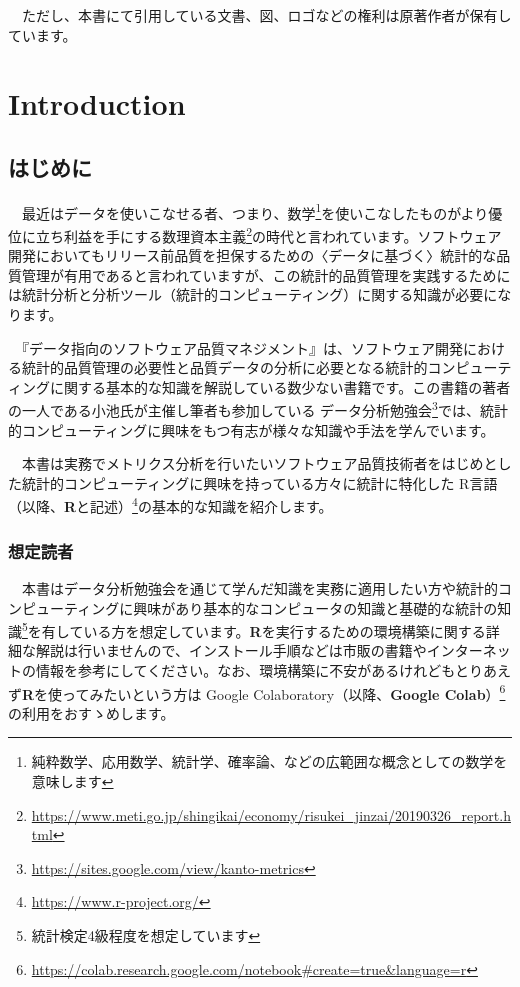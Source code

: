 \documentclass[
  12pt,
]{book}
\DeclareRobustCommand{\href}[2]{#2\footnote{\url{#1}}}
\begin{document}
　ただし、本書にて引用している文書、図、ロゴなどの権利は原著作者が保有しています。

\hypertarget{part-introduction}{%
\part{Introduction}\label{part-introduction}}

\hypertarget{ux306fux3058ux3081ux306b}{%
\chapter*{はじめに}\label{ux306fux3058ux3081ux306b}}

　最近はデータを使いこなせる者、つまり、数学\footnote{純粋数学、応用数学、統計学、確率論、などの広範囲な概念としての数学を意味します}を使いこなしたものがより優位に立ち利益を手にする\href{https://www.meti.go.jp/shingikai/economy/risukei_jinzai/20190326_report.html}{数理資本主義}の時代と言われています。ソフトウェア開発においてもリリース前品質を担保するための〈データに基づく〉統計的な品質管理が有用であると言われていますが、この統計的品質管理を実践するためには統計分析と分析ツール（統計的コンピューティング）に関する知識が必要になります。

　『データ指向のソフトウェア品質マネジメント』\citep{DataOrientedManagement}は、ソフトウェア開発における統計的品質管理の必要性と品質データの分析に必要となる統計的コンピューティングに関する基本的な知識を解説している数少ない書籍です。この書籍の著者の一人である小池氏が主催し筆者も参加している \href{https://sites.google.com/view/kanto-metrics}{データ分析勉強会}では、統計的コンピューティングに興味をもつ有志が様々な知識や手法を学んでいます。

　本書は実務でメトリクス分析を行いたいソフトウェア品質技術者をはじめとした統計的コンピューティングに興味を持っている方々に統計に特化した \href{https://www.r-project.org/}{R言語（以降、\textbf{R}と記述）}の基本的な知識を紹介します。

\hypertarget{ux60f3ux5b9aux8aadux8005}{%
\section*{想定読者}\label{ux60f3ux5b9aux8aadux8005}}

　本書はデータ分析勉強会を通じて学んだ知識を実務に適用したい方や統計的コンピューティングに興味があり基本的なコンピュータの知識と基礎的な統計の知識\footnote{統計検定4級程度を想定しています}を有している方を想定しています。\textbf{R}を実行するための環境構築に関する詳細な解説は行いませんので、インストール手順などは市販の書籍やインターネットの情報を参考にしてください。なお、環境構築に不安があるけれどもとりあえず\textbf{R}を使ってみたいという方は \href{https://colab.research.google.com/notebook\#create=true\&language=r}{Google Colaboratory（以降、\textbf{Google Colab}）}の利用をおすゝめします。
\end{document}
